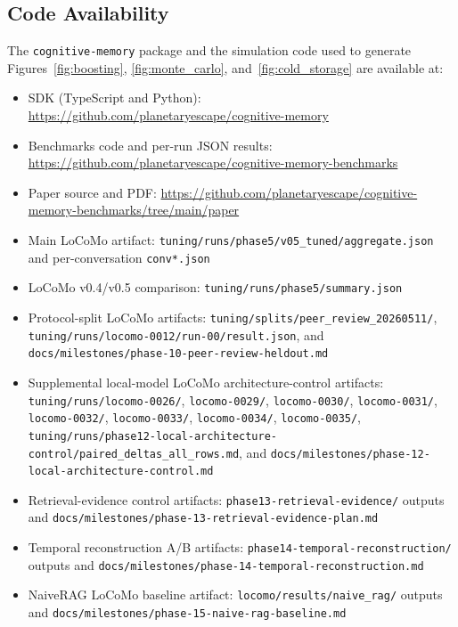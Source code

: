 \documentclass[11pt,a4paper]{article}
\begin{document}
\subsection*{Code Availability}

The \texttt{cognitive-memory} package and the simulation code used to generate Figures~\ref{fig:boosting}, \ref{fig:monte_carlo}, and~\ref{fig:cold_storage} are available at:

\begin{itemize}
\raggedright
    \item SDK (TypeScript and Python): \href{https://github.com/planetaryescape/cognitive-memory}{https://github.com/planetaryescape/cognitive-memory}
    \item Benchmarks code and per-run JSON results: \href{https://github.com/planetaryescape/cognitive-memory-benchmarks}{https://github.com/planetaryescape/cognitive-memory-benchmarks}
    \item Paper source and PDF: \href{https://github.com/planetaryescape/cognitive-memory-benchmarks/tree/main/paper}{https://github.com/planetaryescape/cognitive-memory-benchmarks/tree/main/paper}
    \item Main LoCoMo artifact: \texttt{tuning/runs/phase5/v05\_tuned/aggregate.json} and per-conversation \texttt{conv*.json}
    \item LoCoMo v0.4/v0.5 comparison: \texttt{tuning/runs/phase5/summary.json}
    \item Protocol-split LoCoMo artifacts: \texttt{tuning/splits/peer\_review\_20260511/}, \texttt{tuning/runs/locomo-0012/run-00/result.json}, and \texttt{docs/milestones/phase-10-peer-review-heldout.md}
    \item Supplemental local-model LoCoMo architecture-control artifacts: \texttt{tuning/runs/locomo-0026/}, \texttt{locomo-0029/}, \texttt{locomo-0030/}, \texttt{locomo-0031/}, \texttt{locomo-0032/}, \texttt{locomo-0033/}, \texttt{locomo-0034/}, \texttt{locomo-0035/}, \texttt{tuning/runs/phase12-local-architecture-control/paired\_deltas\_all\_rows.md}, and \texttt{docs/milestones/phase-12-local-architecture-control.md}
    \item Retrieval-evidence control artifacts: \texttt{phase13-retrieval-evidence/} outputs and \texttt{docs/milestones/phase-13-retrieval-evidence-plan.md}
    \item Temporal reconstruction A/B artifacts: \texttt{phase14-temporal-reconstruction/} outputs and \texttt{docs/milestones/phase-14-temporal-reconstruction.md}
    \item NaiveRAG LoCoMo baseline artifact: \texttt{locomo/results/naive\_rag/} outputs and \texttt{docs/milestones/phase-15-naive-rag-baseline.md}

\end{itemize}
\end{document}
